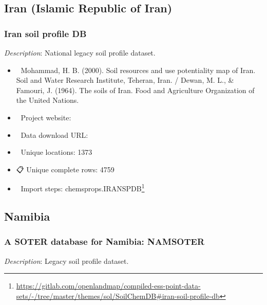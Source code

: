\documentclass[
  graybox,natbib,nospthms]{svmono}
\providecommand{\tightlist}{%
  \setlength{\itemsep}{0pt}\setlength{\parskip}{0pt}}
\providecommand{\tightlist}{\setlength{\itemsep}{0pt}\setlength{\parskip}{0pt}}
\renewcommand{\href}[2]{#2 (\url{#1})}
\renewcommand{\href}[2]{#2\footnote{\url{#1}}}
\begin{document}
\hypertarget{iran-islamic-republic-of-iran}{%
\subsection{Iran (Islamic Republic of Iran)}\label{iran-islamic-republic-of-iran}}

\hypertarget{iran-soil-profile-db}{%
\subsubsection{Iran soil profile DB}\label{iran-soil-profile-db}}

\emph{Description}: National legacy soil profile dataset.

\begin{itemize}
\tightlist
\item
  📕 Mohammad, H. B. (2000). Soil resources and use potentiality map of Iran. Soil and Water Research Institute, Teheran, Iran. / Dewan, M. L., \& Famouri, J. (1964). The soils of Iran. Food and Agriculture Organization of the United Nations.\\
\item
  🔗 Project website:\\
\item
  📂 Data download URL:\\
\item
  📍 Unique locations: 1373\\
\item
  📋 Unique complete rows: 4759\\
\item
  📝 Import steps: \href{https://gitlab.com/openlandmap/compiled-ess-point-data-sets/-/tree/master/themes/sol/SoilChemDB\#iran-soil-profile-db}{chemsprops.IRANSPDB}
\end{itemize}

\hypertarget{namibia}{%
\subsection{Namibia}\label{namibia}}

\hypertarget{a-soter-database-for-namibia-namsoter}{%
\subsubsection{A SOTER database for Namibia: NAMSOTER}\label{a-soter-database-for-namibia-namsoter}}

\emph{Description}: Legacy soil profile dataset.
\end{document}
